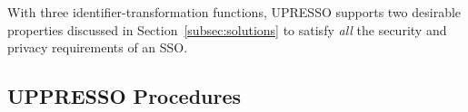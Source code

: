With three identifier-transformation functions, UPRESSO supports two desirable properties discussed in Section~\ref{subsec:solutions}
to satisfy {\em all} the security and privacy requirements of an SSO. %

\subsection{UPPRESSO Procedures}
\label{implementations}

